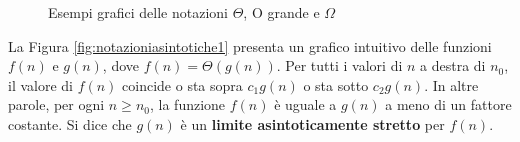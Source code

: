 \begin{figure}[ht!]
	\centering
	 \quad
	 \quad
	\caption{Esempi grafici delle notazioni $\Theta$, O grande e $\Omega$}
\end{figure}

La Figura \ref{fig:notazioniasintotiche1} presenta un grafico intuitivo delle funzioni $f(n)$ e $g(n)$, dove $f(n)=\Theta(g(n))$. Per tutti i valori di $n$ a destra di $n_{0}$, il valore di $f(n)$ coincide o sta sopra $c_{1}g(n)$ o sta sotto $c_{2}g(n)$. In altre parole, per ogni $n\geq n_{0}$, la funzione $f(n)$ è uguale a $g(n)$ a meno di un fattore costante. Si dice che $g(n)$ è un \textbf{limite asintoticamente stretto} per $f(n)$.



